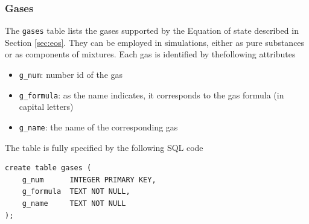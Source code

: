 \subsubsection{Gases}
The \texttt{gases} table lists the gases supported by the Equation of state described in Section \ref{sec:eos}.  They can be employed in simulations, either as pure substances or as components of mixtures.  
Each gas is identified by thefollowing attributes
\begin{itemize}
    \item \texttt{g\_num}: number id of the gas
    \item \texttt{g\_formula}: as the name indicates, it corresponds to the gas formula (in capital letters)
    \item \texttt{g\_name}: the name of the corresponding gas
\end{itemize}

The table is fully specified by the following SQL code
\begin{verbatim}
create table gases (
    g_num      INTEGER PRIMARY KEY,
    g_formula  TEXT NOT NULL,
    g_name     TEXT NOT NULL
);
\end{verbatim}


